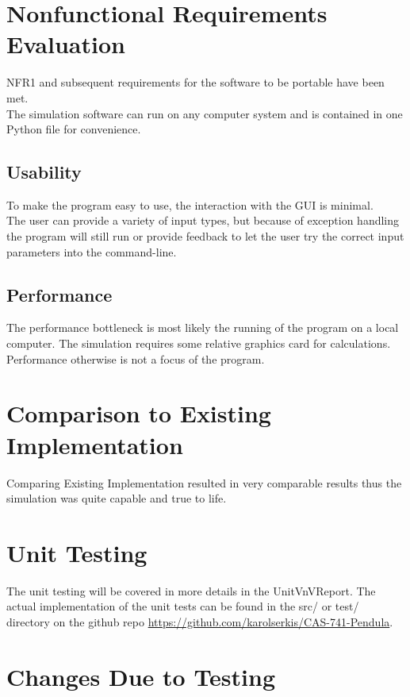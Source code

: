\documentclass[12pt, titlepage]{article}
\begin{document}
\section{Nonfunctional Requirements Evaluation}

NFR1 and subsequent requirements for the software to be portable have been met.\\
The simulation software can run on any computer system and is contained in one 
Python file for convenience.

\subsection{Usability}

To make the program easy to use, the interaction with the GUI is minimal. \\
The user can provide a variety of input types, but because of exception handling
the program will still run or provide feedback to let the user try the correct input 
parameters into the command-line.
		
\subsection{Performance}

The performance bottleneck is most likely the running of the program 
on a local computer. The simulation requires some relative graphics card for 
calculations. Performance otherwise is not a focus of the program.
	
\section{Comparison to Existing Implementation}	

Comparing Existing Implementation resulted in very comparable results
thus the simulation was quite capable and true to life.

\section{Unit Testing}

The unit testing will be covered in more details in the UnitVnVReport. The 
actual implementation of the unit tests can be found in the src/ or test/ 
directory on the github repo \url{https://github.com/karolserkis/CAS-741-Pendula}.

\section{Changes Due to Testing}
\end{document}
